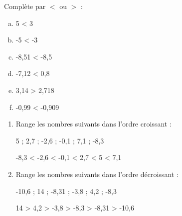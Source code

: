 \documentclass[a4paper,11pt]{article}
\begin{document}
\begin{question}[(3 points)]
	Complète par $<$ ou $>$ :

	\begin{multicols}{3}
		\begin{enumerate}[a)]
			\item 5 {\color{red} <} 3
			\item -5 {\color{red} <} -3
			\item -8,51 {\color{red} <} -8,5
			\item -7,12 {\color{red} <} 0,8
			\item 3,14 {\color{red} >} 2,718
			\item -0,99 {\color{red} <} -0,909
		\end{enumerate}
	\end{multicols}
\end{question}

\begin{question}[(2 points)]
	\begin{enumerate}
		\item Range les nombres suivants dans l'ordre croissant :

		      5 ; 2,7 ; -2,6 ; -0,1 ; 7,1 ; -8,3

		      {\color{red} -8,3 < -2,6 < -0,1 < 2,7 < 5 < 7,1}
		\item Range les nombres suivants dans l'ordre décroissant :

		      -10,6 ; 14 ; -8,31 ; -3,8 ; 4,2 ; -8,3

		      {\color{red} 14 > 4,2 > -3,8 > -8,3 > -8,31 > -10,6}
	\end{enumerate}
\end{question}
\end{document}
